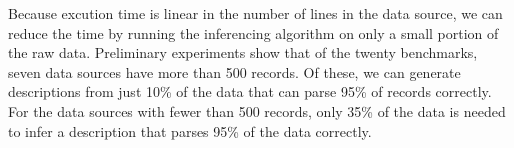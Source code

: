 Because excution time is linear in the
number of lines in the data source, we can reduce the time by 
running the inferencing algorithm on only a small portion of the raw
data. 
Preliminary experiments show that of the twenty benchmarks, seven data sources
have more than 500 records.  Of these, we can generate
descriptions from just 10\% of the data that can
parse 95\% of records correctly.
For the data sources with fewer than 500 records, 
only 35\% of the data is needed to infer a description that parses 
95\% of the data correctly.

